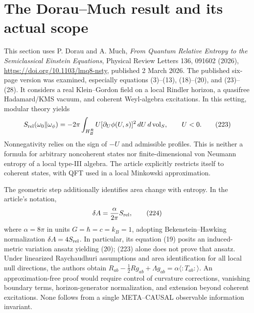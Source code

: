 \documentclass[11pt,a4paper,oneside]{book}
\begin{document}
\section{The Dorau--Much result and its actual scope}
This section uses P. Dorau and A. Much, \emph{From Quantum Relative Entropy to the Semiclassical Einstein Equations}, Physical Review Letters 136, 091602 (2026), \url{https://doi.org/10.1103/lmq8-nsty}, published 2 March 2026. The published six-page version was examined, especially equations (3)--(13), (18)--(20), and (23)--(28). It considers a real Klein--Gordon field on a local Rindler horizon, a quasifree Hadamard/KMS vacuum, and coherent Weyl-algebra excitations. In this setting, modular theory yields
\begin{equation}S_{\rm rel}(\omega_0\|\omega_\phi)=-2\pi\int_{H_B^R}U[\partial_U\phi(U,s)]^2\,dU\,d\operatorname{vol}_S,\qquad U<0.\tag{223}\end{equation}
Nonnegativity relies on the sign of $-U$ and admissible profiles. This is neither a formula for arbitrary noncoherent states nor finite-dimensional von Neumann entropy of a local type-III algebra. The article explicitly restricts itself to coherent states, with QFT used in a local Minkowski approximation.

The geometric step additionally identifies area change with entropy. In the article's notation,
\begin{equation}\delta A=\frac{\alpha}{2\pi}S_{\rm rel},\tag{224}\end{equation}
where $\alpha=8\pi$ in units $G=\hbar=c=k_B=1$, adopting Bekenstein--Hawking normalization $\delta A=4S_{\rm rel}$. In particular, its equation (19) posits an induced-metric variation ansatz yielding (20); (223) alone does not prove that ansatz. Under linearized Raychaudhuri assumptions and area identification for all local null directions, the authors obtain $R_{ab}-\tfrac12Rg_{ab}+\Lambda g_{ab}=\alpha\langle:T_{ab}:\rangle$. An approximation-free proof would require control of curvature corrections, vanishing boundary terms, horizon-generator normalization, and extension beyond coherent excitations. None follows from a single META--CAUSAL observable information invariant.
\end{document}
